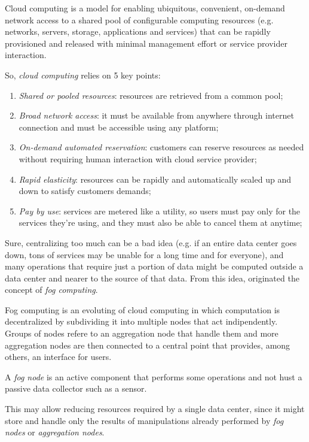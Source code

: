 \begin{definition}
    Cloud computing is a model for enabling ubiquitous, convenient,
    on-demand network access to a shared pool of configurable computing
    resources (e.g. networks, servers, storage, applications and services) that
    can be rapidly provisioned and released with minimal management effort
    or service provider interaction.
\end{definition}

\noindent
So, \emph{cloud computing} relies on 5 key points:
\begin{enumerate}
    \item\emph{Shared or pooled resources}: resources are retrieved from a
    common pool;
    \item\emph{Broad network access}: it must be available from anywhere
    through internet connection and must be accessible using any platform;
    \item\emph{On-demand automated reservation}: customers can reserve
    resources as needed without requiring human interaction with cloud service
    provider;
    \item\emph{Rapid elasticity}: resources can be rapidly and automatically
    scaled up and down to satisfy customers demands;
    \item\emph{Pay by use}: services are metered like a utility, so users must
    pay only for the services they're using, and they must also be able to
    cancel them at anytime;
\end{enumerate}\noindent
Sure, centralizing too much can be a bad idea (e.g. if an entire data center
goes down, tons of services may be unable for a long time and for everyone),
and many operations that require just a  portion of data might be
computed outside a data center and nearer to the source of that data.
From this idea, originated the concept of \emph{fog computing}.

\begin{definition}
    Fog computing is an evoluting of cloud computing in which computation is
    decentralized by subdividing it into multiple nodes that act indipendently.
    Groups of nodes refere to an aggregation node that handle them and
    more aggregation nodes are then connected to a central point that provides,
    among others, an interface for users.
\end{definition}
\begin{note}
    A \emph{fog node} is an active component that performs some operations
    and not hust a passive data collector such as a sensor.
\end{note}

\noindent
This may allow reducing resources required by a single data center, since it
might store and handle only the results of manipulations already performed by
\emph{fog nodes} or \emph{aggregation nodes}.